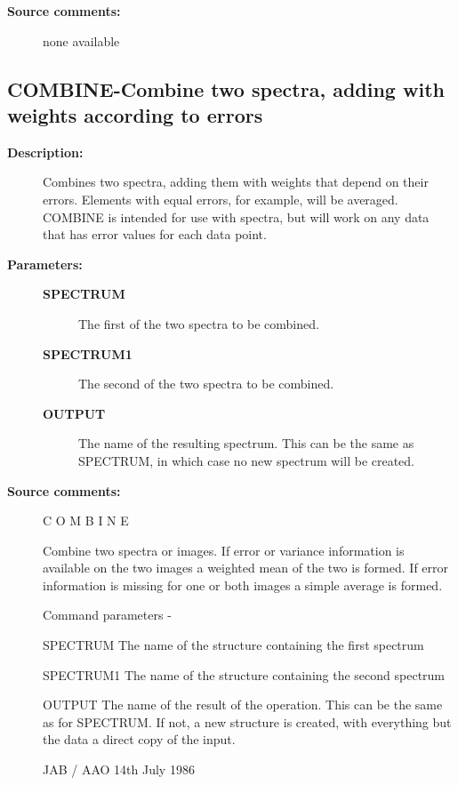 \begin{description}
\item [\textbf{Source comments:}]
\begin{terminalv}
  none available

\end{terminalv}
\end{description}
\subsection{COMBINE-\label{COMBINE}Combine two spectra, adding with weights according to errors}
\begin{description}

\item [\textbf{Description:}]
 Combines two spectra, adding them with weights that depend
 on their errors.  Elements with equal errors, for example,
 will be averaged.  COMBINE is intended for use with
 spectra, but will work on any data that has error values for
 each data point.

\item [\textbf{Parameters:}]
\begin{description}
\item [\textbf{SPECTRUM}]
 The first of the two spectra to be combined.
\item [\textbf{SPECTRUM1}]
 The second of the two spectra to be combined.
\item [\textbf{OUTPUT}]
 The name of the resulting spectrum.  This can be the
 same as SPECTRUM, in which case no new spectrum will
 be created.
\end{description}

\item [\textbf{Source comments:}]
\begin{terminalv}
 C O M B I N E

 Combine two spectra or images. If error or variance information
 is available on the two images a weighted mean of the two
 is formed. If error information is missing for one or both
 images a simple average is formed.

 Command parameters -

 SPECTRUM  The name of the structure containing the first spectrum

 SPECTRUM1 The name of the structure containing the second spectrum

 OUTPUT    The name of the result of the operation.  This can
           be the same as for SPECTRUM.  If not, a new structure
           is created, with everything but the data a direct
           copy of the input.

                                      JAB / AAO  14th July 1986
\end{terminalv}
\end{description}
